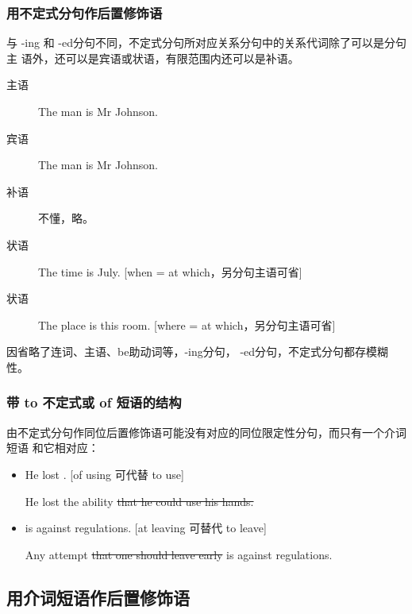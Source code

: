 \subsubsection{用不定式分句作后置修饰语}

与 -ing 和 -ed分句不同，不定式分句所对应关系分句中的关系代词除了可以是分句主
语外，还可以是宾语或状语，有限范围内还可以是补语。
\begin{description}
\item[主语] The man  is Mr Johnson.

\item[宾语] The man  is Mr Johnson.

\item[补语] 不懂，略。

\item[状语] The time  is July.
  [when = at which，另分句主语可省]

\item[状语] The place  is
  this room.  [where = at which，另分句主语可省]
\end{description}

因省略了连词、主语、be助动词等，-ing分句， -ed分句，不定式分句都存模糊性。

\subsubsection{带 to 不定式或 of 短语的结构}

由不定式分句作同位后置修饰语可能没有对应的同位限定性分句，而只有一个介词短语
和它相对应：
\begin{itemize}
\item He lost  . [of using 可代替 to use]

  He lost the ability \sout{that he could use his hands.}

\item {}  is against regulations. [at
  leaving 可替代 to leave]

  Any attempt \sout{that one should leave early} is against regulations.
\end{itemize}


\subsection{用介词短语作后置修饰语}

